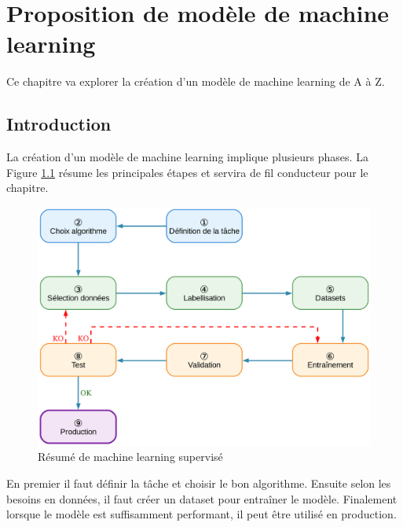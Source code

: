 \chapter{Proposition de modèle de machine learning}
\label{chap:proposition_modele}

Ce chapitre va explorer la création d'un modèle de machine learning de A à Z.

\localtableofcontents

\newpage

\section{Introduction}
La création d'un modèle de machine learning implique plusieurs phases. La Figure \ref{fig:ch3_resume_machine_learning_supervise} résume les principales étapes et servira de fil conducteur pour le chapitre.
\begin{figure}[H]
    \centering
    \includegraphics[width=1\linewidth]{03-tail/A1_fondamentaux_ML/A1_figures/A1_01_resume_machine_learning_supervise.png}
    \caption{Résumé de machine learning supervisé}
    \label{fig:ch3_resume_machine_learning_supervise}
\end{figure}
En premier il faut définir la tâche et choisir le bon algorithme. Ensuite selon les besoins en données, il faut créer un dataset pour entraîner le modèle. Finalement lorsque le modèle est suffisamment performant, il peut être utilisé en production.

